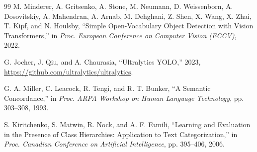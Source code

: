 \begin{thebibliography}{99}
    M. Minderer, A. Gritsenko, A. Stone, M. Neumann, D. Weissenborn, A. Dosovitskiy, A. Mahendran, A. Arnab, M. Dehghani, Z. Shen, X. Wang, X. Zhai, T. Kipf, and N. Houlsby,
    ``Simple Open-Vocabulary Object Detection with Vision Transformers,''
    in {\it Proc. European Conference on Computer Vision (ECCV)}, 2022.

    G. Jocher, J. Qiu, and A. Chaurasia,
    ``Ultralytics YOLO,''
    2023, \url{https://github.com/ultralytics/ultralytics}.

    G. A. Miller, C. Leacock, R. Tengi, and R. T. Bunker,
    ``A Semantic Concordance,''
    in {\it Proc. ARPA Workshop on Human Language Technology}, pp. 303--308, 1993.

    S. Kiritchenko, S. Matwin, R. Nock, and A. F. Famili,
    ``Learning and Evaluation in the Presence of Class Hierarchies: Application to Text Categorization,''
    in {\it Proc. Canadian Conference on Artificial Intelligence}, pp. 395--406, 2006.

\end{thebibliography}
